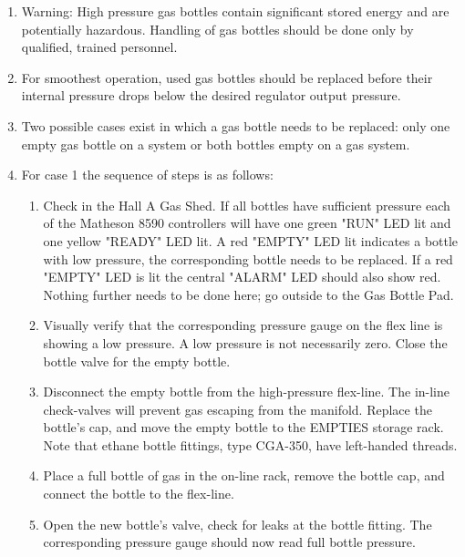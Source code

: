 \begin{enumerate}
\item Warning: High pressure gas bottles contain significant 
stored energy and are potentially hazardous. Handling of gas bottles 
should be done only by qualified, trained personnel.

\item For smoothest operation, used gas bottles should be 
replaced before their internal pressure drops below the desired 
regulator output pressure.

\item Two possible cases exist in which a gas bottle needs 
to be replaced: only one empty gas bottle on a system or 
both bottles empty on a gas system.

\item For case 1 the sequence of steps is as follows:

\begin{enumerate}
     \item Check in the Hall A Gas Shed. If all bottles have 
sufficient pressure each of the Matheson 8590 controllers 
will have one green "RUN" LED lit and one yellow "READY" LED lit. 
A red "EMPTY" LED lit indicates a bottle with low pressure, the 
corresponding bottle needs to be replaced. If a red "EMPTY" LED is lit 
the central "ALARM" LED should also show red. Nothing further needs 
to be done here; go outside to the Gas Bottle Pad. 

    \item Visually verify that the corresponding pressure gauge on 
the flex line is showing a low pressure. A low pressure is not 
necessarily zero. Close the bottle valve for the empty bottle.

    \item Disconnect the empty bottle from the high-pressure flex-line. 
The in-line check-valves will prevent gas escaping from the manifold. 
Replace the bottle's cap, and move the empty bottle to the EMPTIES 
storage rack. Note that ethane bottle fittings, type CGA-350, have 
left-handed threads.

    \item Place a full bottle of gas in the on-line rack, remove the 
bottle cap, and connect the bottle to the flex-line.

    \item Open the new bottle's valve, check for leaks at the bottle 
fitting. The corresponding pressure gauge should now read full bottle pressure.


\end{enumerate}
\end{enumerate}
